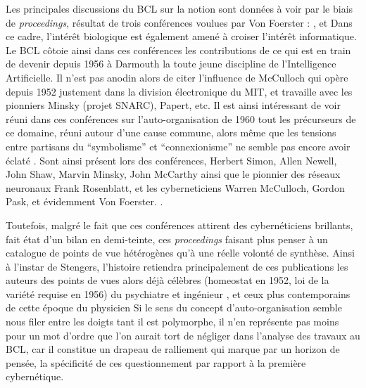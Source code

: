 Les principales discussions du BCL sur la notion sont données à voir par le biais de \textit{proceedings}, résultat de trois conférences voulues par Von Foerster : \autocite{Yovits1960}, \autocite{Yovits1962} et \autocite{Foerster1962} Dans ce cadre, l'intérêt biologique est également amené à croiser l'intérêt informatique. Le BCL côtoie ainsi dans ces conférences les contributions de ce qui est en train de devenir depuis 1956 à Darmouth la toute jeune discipline de l'Intelligence Artificielle. Il n'est pas anodin alors de citer l'influence de McCulloch qui opère depuis 1952 justement dans la division électronique du MIT, et travaille avec les pionniers Minsky (projet SNARC), Papert, etc. Il est ainsi intéressant de voir réuni dans ces conférences sur l'auto-organisation de 1960 tout les précurseurs de ce domaine, réuni autour d'une cause commune, alors même que les tensions entre partisans du \enquote{symbolisme} et \enquote {connexionisme} ne semble pas encore avoir éclaté . Sont ainsi présent lors des conférences, Herbert Simon, Allen Newell, John Shaw, Marvin Minsky, John McCarthy ainsi que le pionnier des réseaux neuronaux Frank Rosenblatt, et les cyberneticiens Warren McCulloch, Gordon Pask, et évidemment Von Foerster. \autocites[256]{Asaro2007}{Yovits1960}.

Toutefois, malgré le fait que ces conférences attirent des cybernéticiens brillants, \textcite[87]{Stengers1985} fait état d'un bilan en demi-teinte, ces \textit{proceedings} faisant plus penser à un catalogue de points de vue hétérogènes qu'à une réelle volonté de synthèse. Ainsi à l'instar de Stengers, l'histoire retiendra principalement de ces publications les auteurs des points de vues alors déjà célèbres (homeostat en 1952, loi de la variété requise en 1956) du psychiatre et ingénieur \autocites{Ashby1947, Ashby1962}, et ceux plus contemporains de cette époque du physicien \textcite{Foerster1959} \autocites{Muller2007a}[55-56]{Stengers1985} Si le sens du concept d'auto-organisation semble nous filer entre les doigts tant il est polymorphe, il n'en représente pas moins pour \textcite[106-110]{Livet1985} un mot d'ordre que l'on aurait tort de négliger dans l'analyse des travaux au BCL, car il constitue un drapeau de ralliement qui marque par un horizon de pensée, la spécificité de ces questionnement par rapport à la première cybernétique.

